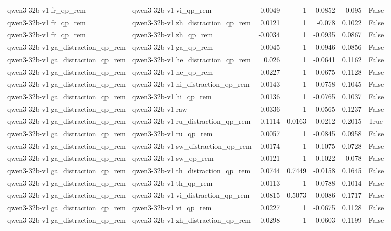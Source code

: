 \begin{table}
\begin{tabular}{l l r r r r l}
qwen3-32b-v1|fr_qp_rem & qwen3-32b-v1|vi_qp_rem & 0.0049 & 1 & -0.0852 & 0.095 & False \\
qwen3-32b-v1|fr_qp_rem & qwen3-32b-v1|zh_distraction_qp_rem & 0.0121 & 1 & -0.078 & 0.1022 & False \\
qwen3-32b-v1|fr_qp_rem & qwen3-32b-v1|zh_qp_rem & -0.0034 & 1 & -0.0935 & 0.0867 & False \\
qwen3-32b-v1|ga_distraction_qp_rem & qwen3-32b-v1|ga_qp_rem & -0.0045 & 1 & -0.0946 & 0.0856 & False \\
qwen3-32b-v1|ga_distraction_qp_rem & qwen3-32b-v1|he_distraction_qp_rem & 0.026 & 1 & -0.0641 & 0.1162 & False \\
qwen3-32b-v1|ga_distraction_qp_rem & qwen3-32b-v1|he_qp_rem & 0.0227 & 1 & -0.0675 & 0.1128 & False \\
qwen3-32b-v1|ga_distraction_qp_rem & qwen3-32b-v1|hi_distraction_qp_rem & 0.0143 & 1 & -0.0758 & 0.1045 & False \\
qwen3-32b-v1|ga_distraction_qp_rem & qwen3-32b-v1|hi_qp_rem & 0.0136 & 1 & -0.0765 & 0.1037 & False \\
qwen3-32b-v1|ga_distraction_qp_rem & qwen3-32b-v1|raw & 0.0336 & 1 & -0.0565 & 0.1237 & False \\
qwen3-32b-v1|ga_distraction_qp_rem & qwen3-32b-v1|ru_distraction_qp_rem & 0.1114 & 0.0163 & 0.0212 & 0.2015 & True \\
qwen3-32b-v1|ga_distraction_qp_rem & qwen3-32b-v1|ru_qp_rem & 0.0057 & 1 & -0.0845 & 0.0958 & False \\
qwen3-32b-v1|ga_distraction_qp_rem & qwen3-32b-v1|sw_distraction_qp_rem & -0.0174 & 1 & -0.1075 & 0.0728 & False \\
qwen3-32b-v1|ga_distraction_qp_rem & qwen3-32b-v1|sw_qp_rem & -0.0121 & 1 & -0.1022 & 0.078 & False \\
qwen3-32b-v1|ga_distraction_qp_rem & qwen3-32b-v1|th_distraction_qp_rem & 0.0744 & 0.7449 & -0.0158 & 0.1645 & False \\
qwen3-32b-v1|ga_distraction_qp_rem & qwen3-32b-v1|th_qp_rem & 0.0113 & 1 & -0.0788 & 0.1014 & False \\
qwen3-32b-v1|ga_distraction_qp_rem & qwen3-32b-v1|vi_distraction_qp_rem & 0.0815 & 0.5073 & -0.0086 & 0.1717 & False \\
qwen3-32b-v1|ga_distraction_qp_rem & qwen3-32b-v1|vi_qp_rem & 0.0227 & 1 & -0.0675 & 0.1128 & False \\
qwen3-32b-v1|ga_distraction_qp_rem & qwen3-32b-v1|zh_distraction_qp_rem & 0.0298 & 1 & -0.0603 & 0.1199 & False \\

\end{tabular}
\end{table}

